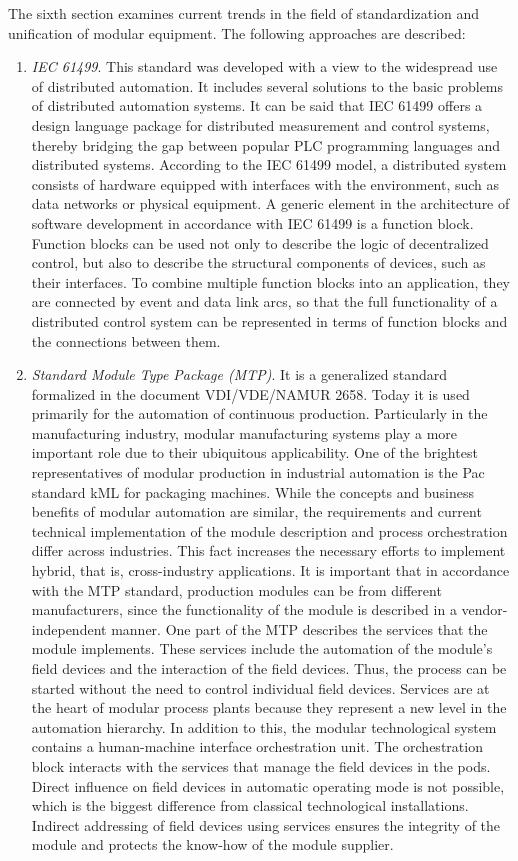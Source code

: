 The sixth section examines current trends in the field of standardization and unification of modular equipment. The following approaches are described:

\begin{enumerate}
	\item\textit{IEC 61499}. This standard was developed with a view to the widespread use of distributed automation. It includes several solutions to the basic problems of distributed automation systems. It can be said that IEC 61499 offers a design language package for distributed measurement and control systems, thereby bridging the gap between popular PLC programming languages ​​and distributed systems. According to the IEC 61499 model, a distributed system consists of hardware equipped with interfaces with the environment, such as data networks or physical equipment. A generic element in the architecture of software development in accordance with IEC 61499 is a function block. Function blocks can be used not only to describe the logic of decentralized control, but also to describe the structural components of devices, such as their interfaces. To combine multiple function blocks into an application, they are connected by event and data link arcs, so that the full functionality of a distributed control system can be represented in terms of function blocks and the connections between them.
	\item\textit{Standard Module Type Package (MTP)}. It is a generalized standard formalized in the document VDI/VDE/NAMUR 2658. Today it is used primarily for the automation of continuous production. Particularly in the manufacturing industry, modular manufacturing systems play a more important role due to their ubiquitous applicability. One of the brightest representatives of modular production in industrial automation is the Pac standard kML for packaging machines. While the concepts and business benefits of modular automation are similar, the requirements and current technical implementation of the module description and process orchestration differ across industries. This fact increases the necessary efforts to implement hybrid, that is, cross-industry applications. It is important that in accordance with the MTP standard, production modules can be from different manufacturers, since the functionality of the module is described in a vendor-independent manner. One part of the MTP describes the services that the module implements. These services include the automation of the module's field devices and the interaction of the field devices. Thus, the process can be started without the need to control individual field devices. Services are at the heart of modular process plants because they represent a new level in the automation hierarchy. In addition to this, the modular technological system contains a human-machine interface orchestration unit. The orchestration block interacts with the services that manage the field devices in the pods. Direct influence on field devices in automatic operating mode is not possible, which is the biggest difference from classical technological installations. Indirect addressing of field devices using services ensures the integrity of the module and protects the know-how of the module supplier.

\end{enumerate}
